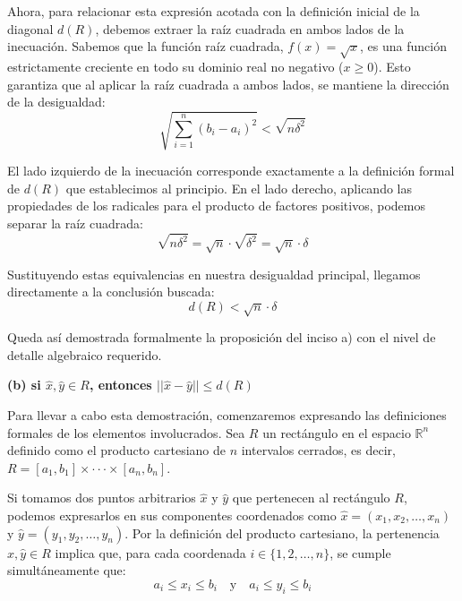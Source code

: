 \documentclass[11pt,letterpaper]{article}
\begin{document}
Ahora, para relacionar esta expresión acotada con la definición inicial de la diagonal $d(R)$, debemos extraer la raíz cuadrada en ambos lados de la inecuación. Sabemos que la función raíz cuadrada, $f(x) = \sqrt{x}$, es una función estrictamente creciente en todo su dominio real no negativo ($x \ge 0$). Esto garantiza que al aplicar la raíz cuadrada a ambos lados, se mantiene la dirección de la desigualdad:
\begin{equation*}
\sqrt{\sum_{i=1}^{n} (b_{i}-a_{i})^{2}} < \sqrt{n\delta^{2}}
\end{equation*}

El lado izquierdo de la inecuación corresponde exactamente a la definición formal de $d(R)$ que establecimos al principio. En el lado derecho, aplicando las propiedades de los radicales para el producto de factores positivos, podemos separar la raíz cuadrada:
\begin{equation*}
\sqrt{n\delta^{2}} = \sqrt{n} \cdot \sqrt{\delta^{2}} = \sqrt{n} \cdot \delta
\end{equation*}

Sustituyendo estas equivalencias en nuestra desigualdad principal, llegamos directamente a la conclusión buscada:
\begin{equation*}
d(R) < \sqrt{n}\cdot\delta
\end{equation*}

Queda así demostrada formalmente la proposición del inciso a) con el nivel de detalle algebraico requerido.

\textbf{(b) si $\hat{x},\hat{y}\in R$, entonces $||\hat{x}-\hat{y}||\le d(R)$}

Para llevar a cabo esta demostración, comenzaremos expresando las definiciones formales de los elementos involucrados. Sea $R$ un rectángulo en el espacio $\mathbb{R}^{n}$ definido como el producto cartesiano de $n$ intervalos cerrados, es decir, $R=[a_{1},b_{1}]\times\cdot\cdot\cdot\times[a_{n},b_{n}]$. 

Si tomamos dos puntos arbitrarios $\hat{x}$ y $\hat{y}$ que pertenecen al rectángulo $R$, podemos expresarlos en sus componentes coordenados como $\hat{x} = (x_{1}, x_{2}, \dots, x_{n})$ y $\hat{y} = (y_{1}, y_{2}, \dots, y_{n})$. Por la definición del producto cartesiano, la pertenencia $\hat{x},\hat{y}\in R$ implica que, para cada coordenada $i \in \{1, 2, \dots, n\}$, se cumple simultáneamente que:
\begin{equation*}
a_{i} \le x_{i} \le b_{i} \quad \text{y} \quad a_{i} \le y_{i} \le b_{i}
\end{equation*}
\end{document}
